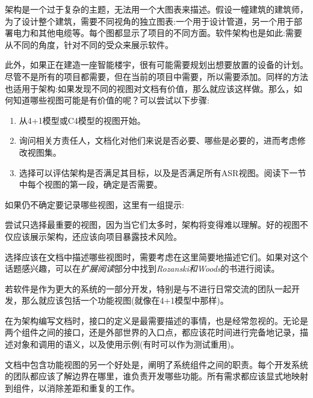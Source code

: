 
架构是一个过于复杂的主题，无法用一个大图表来描述。假设一幢建筑的建筑师，为了设计整个建筑，需要不同视角的独立图表:一个用于设计管道，另一个用于部署电力和其他电缆等。每个图都显示了项目的不同方面。软件架构也是如此:需要从不同的角度，针对不同的受众来展示软件。

此外，如果正在建造一座智能楼宇，很有可能需要规划出想要放置的设备的计划。尽管不是所有的项目都需要，但在当前的项目中需要，所以需要添加。同样的方法也适用于架构:如果发现不同的视图对文档有价值，那么就应该这样做。那么，如何知道哪些视图可能是有价值的呢？可以尝试以下步骤:

\begin{enumerate}
\item
从4+1模型或C4模型的视图开始。

\item 
询问相关方责任人，文档化对他们来说是否必要、哪些是必要的，进而考虑修改视图集。

\item
选择可以评估架构是否满足其目标，以及是否满足所有ASR视图。阅读下一节中每个视图的第一段，确定是否需要。
\end{enumerate}

如果仍不确定要记录哪些视图，这里有一组提示:

\begin{tcolorbox}[colback=webgreen!5!white,colframe=webgreen!75!black, title=TIP]
\hspace*{0.75cm}尝试只选择最重要的视图，因为当它们太多时，架构将变得难以理解。好的视图不仅应该展示架构，还应该向项目暴露技术风险。
\end{tcolorbox}

选择应该在文档中描述哪些视图时，需要考虑在这里简要地描述它们。如果对这个话题感兴趣，可以在\textit{扩展阅读}部分中找到\textit{Rozanski和Woods}的书进行阅读。


若软件是作为更大的系统的一部分开发，特别是与不进行日常交流的团队一起开发，那么就应该包括一个功能视图(就像在4+1模型中那样)。

在为架构编写文档时，接口的定义是最需要描述的事情，也是经常忽视的。无论是两个组件之间的接口，还是外部世界的入口点，都应该花时间进行完备地记录，描述对象和调用的语义，以及使用示例(有时可以作为测试重用)。

文档中包含功能视图的另一个好处是，阐明了系统组件之间的职责。每个开发系统的团队都应该了解边界在哪里，谁负责开发哪些功能。所有需求都应该显式地映射到组件，以消除差距和重复的工作。


